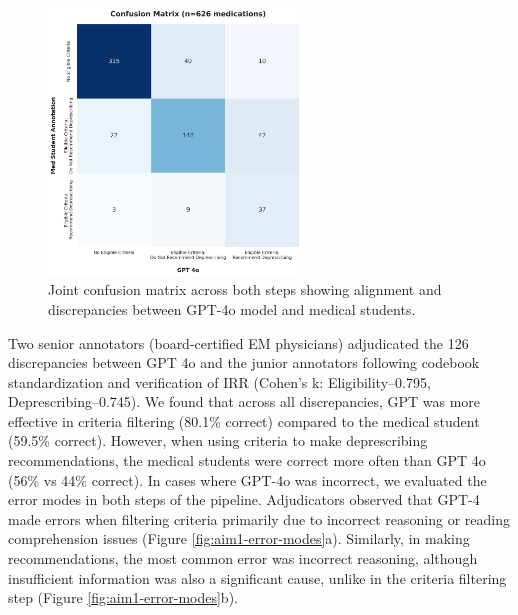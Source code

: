 \begin{figure}
	\centering
	\includegraphics[width=0.6\textwidth] {figures/aim1/medstudent_gpt_confmat.png}
	\caption{Joint confusion matrix across both steps showing alignment and discrepancies between GPT-4o model and medical students. } \label{fig:aim1-confmat}
\end{figure}


Two senior annotators (board-certified EM physicians) adjudicated the 126 discrepancies between GPT 4o and the junior annotators following codebook standardization and verification of IRR (Cohen's k: Eligibility–0.795, Deprescribing–0.745). We found that across all discrepancies, GPT was more effective in criteria filtering (80.1\% correct) compared to the medical student (59.5\% correct). However, when using criteria to make deprescribing recommendations, the medical students were correct more often than GPT 4o (56\% vs 44\% correct). In cases where GPT-4o was incorrect, we evaluated the error modes in both steps of the pipeline. Adjudicators observed that GPT-4 made errors when filtering criteria primarily due to incorrect reasoning or reading comprehension issues (Figure \ref{fig:aim1-error-modes}a). Similarly, in making recommendations, the most common error was incorrect reasoning, although insufficient information was also a significant cause, unlike in the criteria filtering step (Figure \ref{fig:aim1-error-modes}b). 

